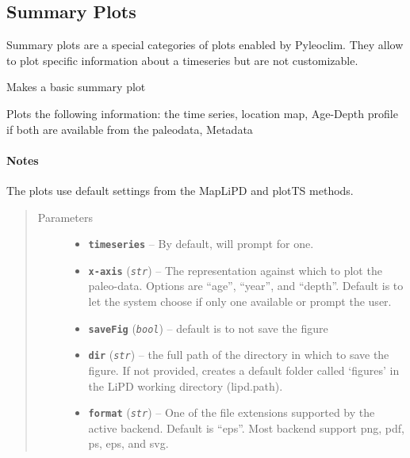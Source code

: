 \documentclass[letterpaper,10pt,english]{sphinxmanual}
\begin{document}
\subsection{Summary Plots}
\label{Main:summary-plots}
Summary plots are a special categories of plots enabled by Pyleoclim.
They allow to plot specific information about a timeseries but are not customizable.

\begin{fulllineitems}
\label{Main:pyleoclim.basicSummary}
Makes a basic summary plot

Plots the following information: the time series, location map,
Age-Depth profile if both are available from the paleodata, Metadata
\paragraph{Notes}

The plots use default settings from the MapLiPD and plotTS methods.
\begin{quote}\begin{description}
\item[{Parameters}] \leavevmode\begin{itemize}
\item {} 
\textbf{\texttt{timeseries}} -- By default, will prompt for one.

\item {} 
\textbf{\texttt{x-axis}} (\emph{\texttt{str}}) -- The representation against which to plot the paleo-data.
Options are ``age'', ``year'', and ``depth''. Default is to let the
system choose if only one available or prompt the user.

\item {} 
\textbf{\texttt{saveFig}} (\emph{\texttt{bool}}) -- default is to not save the figure

\item {} 
\textbf{\texttt{dir}} (\emph{\texttt{str}}) -- the full path of the directory in which to save the figure.
If not provided, creates a default folder called `figures' in the
LiPD working directory (lipd.path).

\item {} 
\textbf{\texttt{format}} (\emph{\texttt{str}}) -- One of the file extensions supported by the active
backend. Default is ``eps''. Most backend support png, pdf, ps, eps,
and svg.


\end{itemize}
\end{description}
\end{quote}
\end{fulllineitems}
\end{document}
